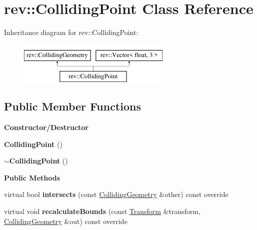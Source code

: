 \hypertarget{classrev_1_1_colliding_point}{}\section{rev\+::Colliding\+Point Class Reference}
\label{classrev_1_1_colliding_point}
Inheritance diagram for rev\+::Colliding\+Point\+:\begin{figure}[H]
\begin{center}
\leavevmode
\includegraphics[height=2.000000cm]{classrev_1_1_colliding_point}
\end{center}
\end{figure}
\subsection*{Public Member Functions}
\begin{Indent}\textbf{ Constructor/\+Destructor}\par
\begin{DoxyCompactItemize}
\item 
\mbox{\label{classrev_1_1_colliding_point_a56eb619a4232ba1a8744987363a3873f}} 
{\bfseries Colliding\+Point} ()
\item 
\mbox{\label{classrev_1_1_colliding_point_aca6d086514a7e1fec584eec7fb181f78}} 
{\bfseries $\sim$\+Colliding\+Point} ()
\end{DoxyCompactItemize}
\end{Indent}
\begin{Indent}\textbf{ Public Methods}\par
\begin{DoxyCompactItemize}
\item 
\mbox{\label{classrev_1_1_colliding_point_a8aad9340c43d11358fbf6858037dd783}} 
virtual bool {\bfseries intersects} (const \mbox{\hyperlink{classrev_1_1_colliding_geometry}{Colliding\+Geometry}} \&other) const override
\item 
\mbox{\label{classrev_1_1_colliding_point_a1e72ae18dba25eb768f6e226e2b80238}} 
virtual void {\bfseries recalculate\+Bounds} (const \mbox{\hyperlink{classrev_1_1_transform}{Transform}} \&transform, \mbox{\hyperlink{classrev_1_1_colliding_geometry}{Colliding\+Geometry}} \&out) const override
\end{DoxyCompactItemize}
\end{Indent}
